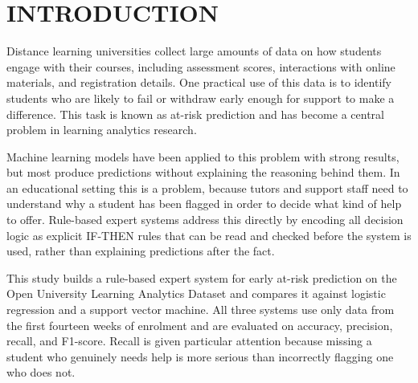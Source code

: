 \section{INTRODUCTION}

Distance learning universities collect large amounts of data on how students engage with their courses, including assessment scores, interactions with online materials, and registration details. One practical use of this data is to identify students who are likely to fail or withdraw early enough for support to make a difference. This task is known as at-risk prediction and has become a central problem in learning analytics research.

Machine learning models have been applied to this problem with strong results, but most produce predictions without explaining the reasoning behind them. In an educational setting this is a problem, because tutors and support staff need to understand why a student has been flagged in order to decide what kind of help to offer. Rule-based expert systems address this directly by encoding all decision logic as explicit IF-THEN rules that can be read and checked before the system is used, rather than explaining predictions after the fact.

This study builds a rule-based expert system for early at-risk prediction on the Open University Learning Analytics Dataset and compares it against logistic regression and a support vector machine. All three systems use only data from the first fourteen weeks of enrolment and are evaluated on accuracy, precision, recall, and F1-score. Recall is given particular attention because missing a student who genuinely needs help is more serious than incorrectly flagging one who does not.

